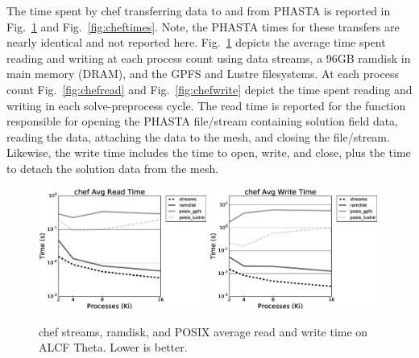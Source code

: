 The time spent by chef transferring data to and from PHASTA is
reported in Fig.~\ref{fig:readWriteTime} and Fig.~\ref{fig:cheftimes}.
Note, the PHASTA times for these transfers are nearly identical and
not reported here.
Fig.~\ref{fig:readWriteTime} depicts the average time spent reading and writing
at each process count using data streams, a 96GB ramdisk in main memory (DRAM),
and the GPFS and Lustre filesystems.
At each process count Fig.~\ref{fig:chefread} and Fig.~\ref{fig:chefwrite} depict
the time spent reading and writing in each solve-preprocess cycle.
The read time is reported for the function responsible for opening the
PHASTA file/stream containing solution field data, reading the data,
attaching the data to the mesh, and closing the file/stream.
Likewise, the write time includes the time to open, write, and close, plus the
time to detach the solution data from the mesh.

\begin{figure} \centering
  \includegraphics[width=0.49\textwidth]{results/phasta-dambreak/theta/chefreadavg.eps}
  \includegraphics[width=0.49\textwidth]{results/phasta-dambreak/theta/chefwriteavg.eps}
  \caption{
    chef streams, ramdisk, and POSIX average read and write time on
    ALCF Theta. Lower is better.
  }
  \label{fig:readWriteTime}
\end{figure}

